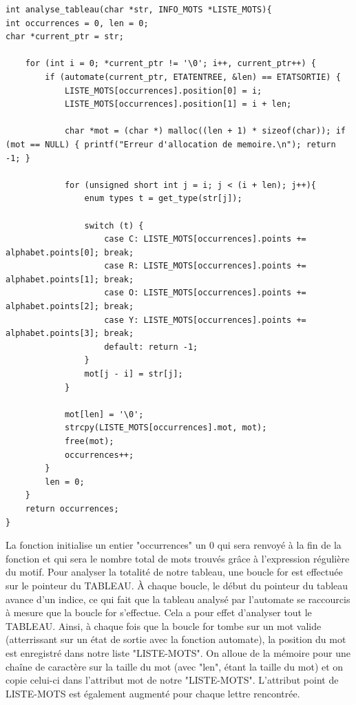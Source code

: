 \documentclass{article}
\begin{document}
\begin{lstlisting}[style=Cstyle]
int analyse_tableau(char *str, INFO_MOTS *LISTE_MOTS){
int occurrences = 0, len = 0;
char *current_ptr = str;

    for (int i = 0; *current_ptr != '\0'; i++, current_ptr++) {
        if (automate(current_ptr, ETATENTREE, &len) == ETATSORTIE) {
            LISTE_MOTS[occurrences].position[0] = i;
            LISTE_MOTS[occurrences].position[1] = i + len;

            char *mot = (char *) malloc((len + 1) * sizeof(char)); if (mot == NULL) { printf("Erreur d'allocation de memoire.\n"); return -1; }

            for (unsigned short int j = i; j < (i + len); j++){
                enum types t = get_type(str[j]);

                switch (t) {
                    case C: LISTE_MOTS[occurrences].points += alphabet.points[0]; break;
                    case R: LISTE_MOTS[occurrences].points += alphabet.points[1]; break;
                    case O: LISTE_MOTS[occurrences].points += alphabet.points[2]; break;
                    case Y: LISTE_MOTS[occurrences].points += alphabet.points[3]; break;
                    default: return -1;
                }
                mot[j - i] = str[j];
            }

            mot[len] = '\0';
            strcpy(LISTE_MOTS[occurrences].mot, mot);
            free(mot);
            occurrences++;
        }
        len = 0;
    }
    return occurrences;
}
\end{lstlisting}
La fonction initialise un entier "occurrences" un 0 qui sera renvoyé à la fin de la fonction et qui sera le nombre total de mots trouvés grâce à l'expression régulière du motif. Pour analyser la totalité de notre tableau, une boucle for est effectuée sur le pointeur du TABLEAU. À chaque boucle, le début du pointeur du tableau avance d'un indice, ce qui fait que la tableau analysé par l'automate se raccourcis à mesure que la boucle for s'effectue. Cela a pour effet d'analyser tout le TABLEAU. Ainsi, à chaque fois que la boucle for tombe sur un mot valide (atterrissant sur un état de sortie avec la fonction automate), la position du mot est enregistré dans notre liste "LISTE-MOTS". On alloue de la mémoire pour une chaîne de caractère sur la taille du mot (avec "len", étant la taille du mot) et on copie celui-ci dans l'attribut mot de notre "LISTE-MOTS". L'attribut point de LISTE-MOTS est également augmenté pour chaque lettre rencontrée.
\end{document}
